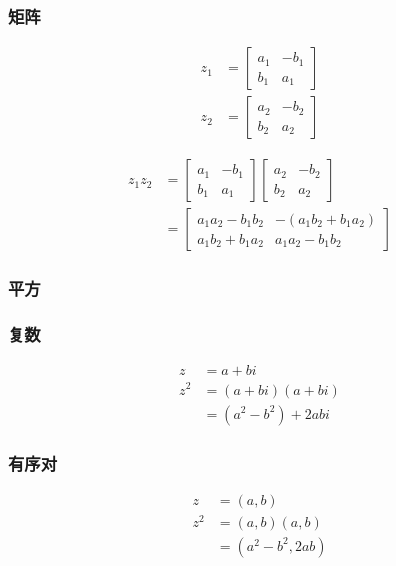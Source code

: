\subsubsection*{矩阵}
$$
\begin{aligned}
z_{1} & =\left[\begin{array}{ll}
a_{1} & -b_{1} \\
b_{1} & a_{1}
\end{array}\right] \\
z_{2} & =\left[\begin{array}{cc}
a_{2} & -b_{2} \\
b_{2} & a_{2}
\end{array}\right]
\end{aligned}
$$

$$
\begin{aligned}
z_{1} z_{2} & =\left[\begin{array}{cc}
a_{1} & -b_{1} \\
b_{1} & a_{1}
\end{array}\right]\left[\begin{array}{cc}
a_{2} & -b_{2} \\
b_{2} & a_{2}
\end{array}\right] \\
& =\left[\begin{array}{cc}
a_{1} a_{2}-b_{1} b_{2} & -\left(a_{1} b_{2}+b_{1} a_{2}\right) \\
a_{1} b_{2}+b_{1} a_{2} & a_{1} a_{2}-b_{1} b_{2}
\end{array}\right]
\end{aligned}
$$

\subsubsection{平方}
\subsubsection*{复数}
$$
\begin{aligned}
z & =a+b i \\
z^{2} & =(a+b i)(a+b i) \\
& =\left(a^{2}-b^{2}\right)+2 a b i
\end{aligned}
$$

\subsubsection*{有序对}
$$
\begin{aligned}
z & =(a, b) \\
z^{2} & =(a, b)(a, b) \\
& =\left(a^{2}-b^{2}, 2 a b\right)
\end{aligned}
$$


